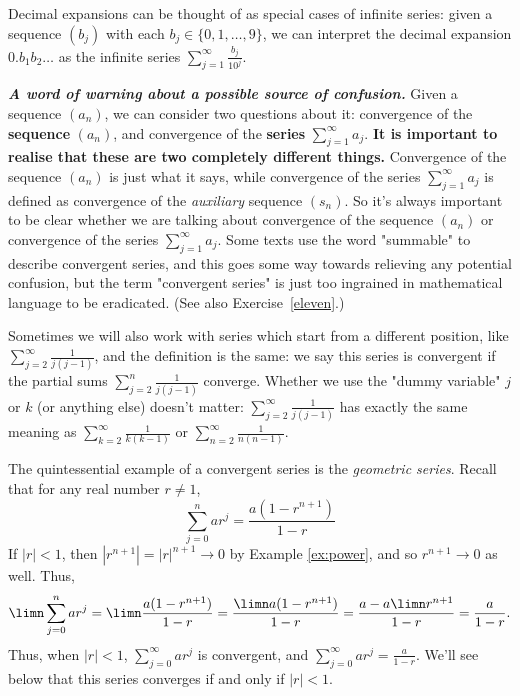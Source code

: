 \documentclass[11pt,dvipsnames]{book}
\numberwithin{figure}{section} %
\numberwithin{table}{section} %
\begin{document}
\medskip
Decimal expansions can be thought of as special cases of infinite series: given a sequence $(b_j)$ with each $b_j \in \{0, 1, \dots , 9\}$, we can interpret the decimal expansion $0.b_1b_2 \dots$ as the infinite series $\sum_{j=1}^\infty \frac{b_j}{10^j}$.

\medskip
\noindent
{\em \bf \em A word of warning about a possible source of confusion.} Given a sequence $(a_n)$, we can consider two questions about it: convergence of the {\bf sequence} $(a_n)$, and convergence of the {\bf series} $\sum_{j=1}^\infty a_j$. {\bf It is important to realise that these are two completely different things.} Convergence of the sequence $(a_n)$ is just what it says, while convergence of the series $\sum_{j=1}^\infty a_j$
is defined as convergence of the {\em auxiliary} sequence $(s_n)$. So it's always important to be clear whether we are talking about convergence of the sequence $(a_n)$ or convergence of the series $\sum_{j=1}^\infty a_j$. Some texts use the word "summable" to describe convergent series, and this goes some way towards relieving any potential confusion, but the term "convergent series" is just too ingrained in mathematical language to be eradicated. (See also Exercise~\ref{eleven}.)

\medskip
Sometimes we will also work with series which start from a different position, like $\sum_{j=2}^{\infty} \frac{1}{j(j-1)}$, and the definition is the same: we say this series is convergent if the partial sums $\sum_{j=2}^{n} \frac{1}{j(j-1)}$ converge. Whether we use the "dummy variable"
$j$ or $k$ (or anything else) doesn't matter: $\sum_{j=2}^{\infty} \frac{1}{j(j-1)}$ has exactly the same meaning as $\sum_{k=2}^{\infty} \frac{1}{k(k-1)}$ or $\sum_{n=2}^{\infty} \frac{1}{n(n-1)}$.

\begin{example}
\label{ex:geometric-series}
The quintessential example of a convergent series is the {\it geometric series}. Recall that for any real number $r \neq 1$,
\begin{equation}
\label{e:gs}
\sum_{j=0}^{n} ar ^{j}=\frac{a(1-r^{n+1})}{1-r}
\end{equation}
If $|r|<1$, then $|r^{n+1}|=|r|^{n+1}\rightarrow 0$ by Example \ref{ex:power}, and so $r^{n+1}\rightarrow 0$ as well. Thus,
\[
\limn \sum_{j=0}^{n}ar^{j} = \limn \frac{a(1-r^{n+1})}{1-r} = \frac{\limn a(1-r^{n+1})}{1-r}=\frac{a- a\limn r^{n+1}}{1-r}=\frac{a}{1-r}.\]
Thus, when $|r|<1$, $\sum_{j=0}^\infty a r^{j}$ is convergent, and $\sum_{j=0}^{\infty} a r^{j}=\frac{a}{1-r}$. We'll see below that this series converges if and only if $|r|<1$.\\
%
\end{example}
\end{document}

